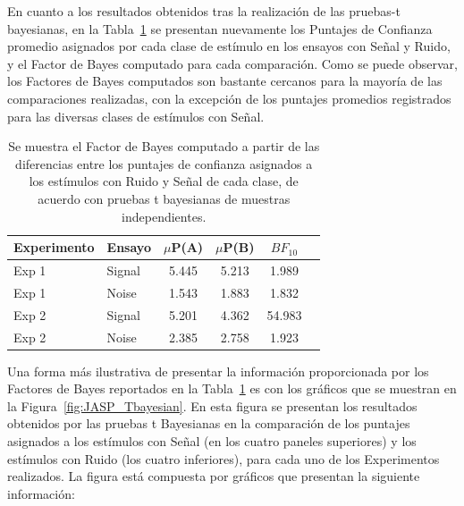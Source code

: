 En cuanto a los resultados obtenidos tras la realización de las pruebas-t bayesianas, en la Tabla~\ref{Tabla_t-Bayesian} se presentan nuevamente los Puntajes de Confianza promedio asignados por cada clase de estímulo en los ensayos con Señal y Ruido, y el Factor de Bayes computado para cada comparación. Como se puede observar, los Factores de Bayes computados son bastante cercanos para la mayoría de las comparaciones realizadas, con la excepción de los puntajes promedios registrados para las diversas clases de estímulos con Señal.\\

\begin{table}
\caption[Prueba T bayesiana para evaluar diferencias en las medias de los puntajes de confianza asigandos entre condiciones]{Se muestra el Factor de Bayes computado a partir de las diferencias entre los puntajes de confianza asignados a los estímulos con Ruido y Señal de cada clase, de acuerdo con pruebas t bayesianas de muestras independientes.}
\label{Tabla_t-Bayesian}
\centering
\begin{tabular}{l l |  c c c c}
\toprule
\textbf{Experimento} & \textbf{Ensayo} & \textbf{$\mu$P(A)} & \textbf{$\mu$P(B)} & \textbf{$BF_{10}$} \\
\midrule
Exp 1 & Signal & 5.445 & 5.213 & 1.989 \\
Exp 1 & Noise & 1.543 & 1.883 & 1.832 \\
Exp 2 & Signal & 5.201 & 4.362  & 54.983 \\
Exp 2 & Noise & 2.385 & 2.758 & 1.923 \\
\bottomrule
\end{tabular}
\end{table}

Una forma más ilustrativa de presentar la información proporcionada por los Factores de Bayes reportados en la Tabla~\ref{Tabla_t-Bayesian} es con los gráficos que se muestran en la Figura~\ref{fig:JASP_Tbayesian}. En esta figura se presentan los resultados obtenidos por las pruebas t Bayesianas en la comparación de los puntajes asignados a los estímulos con Señal (en los cuatro paneles superiores) y los estímulos con Ruido (los cuatro inferiores), para cada uno de los Experimentos realizados. La figura está compuesta por gráficos que presentan la siguiente información:\\

